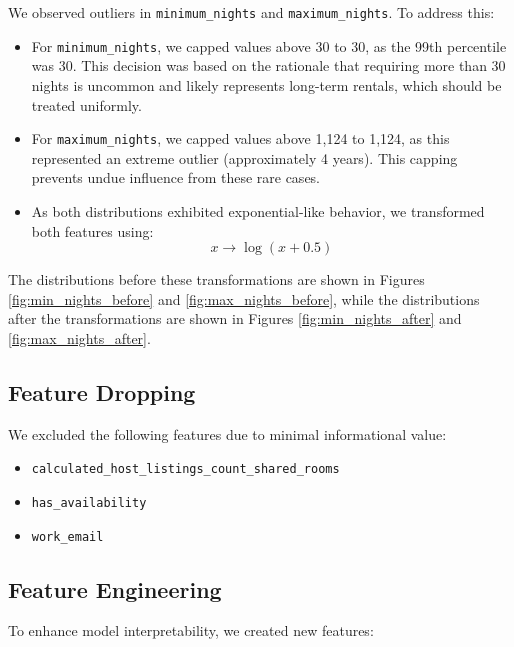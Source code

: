 \documentclass[12pt]{article}
\begin{document}
We observed outliers in \texttt{minimum\_nights} and \texttt{maximum\_nights}. To address this:

\begin{itemize}
    \item For \texttt{minimum\_nights}, we capped values above 30 to 30, as the 99th percentile was 30. This decision was based on the rationale that requiring more than 30 nights is uncommon and likely represents long-term rentals, which should be treated uniformly.
    
    \item For \texttt{maximum\_nights}, we capped values above 1,124 to 1,124, as this represented an extreme outlier (approximately 4 years). This capping prevents undue influence from these rare cases.
    
    \item As both distributions exhibited exponential-like behavior, we transformed both features using:
    \[
    x \to \log(x + 0.5)
    \]
\end{itemize}

The distributions before these transformations are shown in Figures \ref{fig:min_nights_before} and \ref{fig:max_nights_before}, while the distributions after the transformations are shown in Figures \ref{fig:min_nights_after} and \ref{fig:max_nights_after}.

\subsection{Feature Dropping}

We excluded the following features due to minimal informational value:

\begin{itemize}
    \item \texttt{calculated\_host\_listings\_count\_shared\_rooms}
    \item \texttt{has\_availability}
    \item \texttt{work\_email}
\end{itemize}

\subsection{Feature Engineering}

To enhance model interpretability, we created new features:
\end{document}
